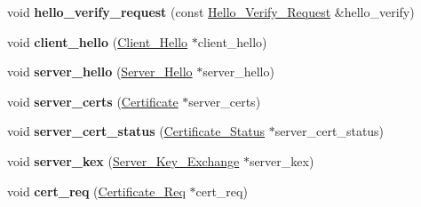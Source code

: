 \begin{DoxyCompactItemize}
void {\bfseries hello\+\_\+verify\+\_\+request} (const \mbox{\hyperlink{class_botan_1_1_t_l_s_1_1_hello___verify___request}{Hello\+\_\+\+Verify\+\_\+\+Request}} \&hello\+\_\+verify)
\item 
\mbox{\label{class_botan_1_1_t_l_s_1_1_handshake___state_aa9a1030de40cd5d414b192f747c45953}} 
void {\bfseries client\+\_\+hello} (\mbox{\hyperlink{class_botan_1_1_t_l_s_1_1_client___hello}{Client\+\_\+\+Hello}} $\ast$client\+\_\+hello)
\item 
\mbox{\label{class_botan_1_1_t_l_s_1_1_handshake___state_ad2cb22e608981641795b724333a5fd69}} 
void {\bfseries server\+\_\+hello} (\mbox{\hyperlink{class_botan_1_1_t_l_s_1_1_server___hello}{Server\+\_\+\+Hello}} $\ast$server\+\_\+hello)
\item 
\mbox{\label{class_botan_1_1_t_l_s_1_1_handshake___state_a286cbb469cf92718d0327e027fbc54f0}} 
void {\bfseries server\+\_\+certs} (\mbox{\hyperlink{class_botan_1_1_t_l_s_1_1_certificate}{Certificate}} $\ast$server\+\_\+certs)
\item 
\mbox{\label{class_botan_1_1_t_l_s_1_1_handshake___state_ad416a7afa4d693413e98b2eda841e34b}} 
void {\bfseries server\+\_\+cert\+\_\+status} (\mbox{\hyperlink{class_botan_1_1_t_l_s_1_1_certificate___status}{Certificate\+\_\+\+Status}} $\ast$server\+\_\+cert\+\_\+status)
\item 
\mbox{\label{class_botan_1_1_t_l_s_1_1_handshake___state_a3e93a64774072eb387025a23f3edb325}} 
void {\bfseries server\+\_\+kex} (\mbox{\hyperlink{class_botan_1_1_t_l_s_1_1_server___key___exchange}{Server\+\_\+\+Key\+\_\+\+Exchange}} $\ast$server\+\_\+kex)
\item 
\mbox{\label{class_botan_1_1_t_l_s_1_1_handshake___state_ad7c7d88355f26076be2eade4d4fb82cc}} 
void {\bfseries cert\+\_\+req} (\mbox{\hyperlink{class_botan_1_1_t_l_s_1_1_certificate___req}{Certificate\+\_\+\+Req}} $\ast$cert\+\_\+req)
\item 
\mbox{\label{class_botan_1_1_t_l_s_1_1_handshake___state_a597280a62d530028d18a98fa7ebaaf25}} 

\end{DoxyCompactItemize}
